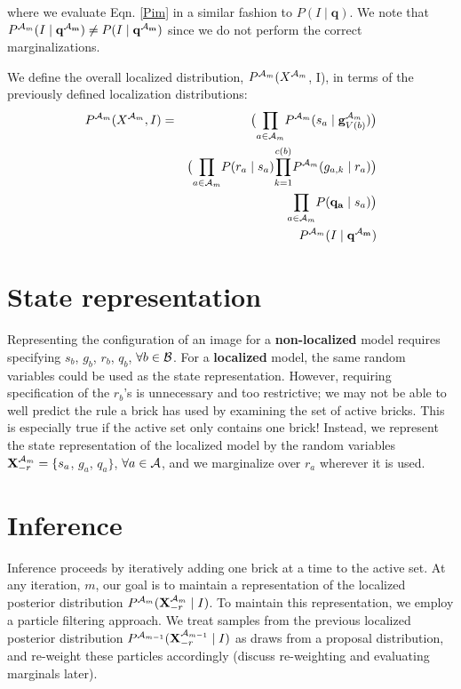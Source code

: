 \documentclass[11pt]{article}
\newcommand{\A}{{\cal A}}
\newcommand{\X}{\mathbf{X}}
\newcommand{\B}{\cal B}
\newcommand{\Xrm}{\X^{\Am}_{-r}}
\newcommand{\Am}{\A_{m}}
\begin{document}
where we evaluate Eqn. \ref{Pim} in a similar fashion to $P(I \mid \mathbf{q})$. We note that $P^{\Am}(I \mid \mathbf{q^{\Am}}) \neq P(I \mid \mathbf{q^{\Am}})$ since we do not perform the correct marginalizations.

We define the overall localized distribution, $P^{\Am}(X^{\Am}$, I), in terms of the previously defined localization distributions:
\begin{eqnarray}
P^{\Am}(X^{\Am}, I)
&=& \big({\displaystyle \prod_{a \in {\Am}}} P^{\Am}(s_a \mid \mathbf{g}^{\Am}_{V({b})}) \big ) \label{eqn.localJoint}\\
& & \big( {\displaystyle \prod_{a \in {\Am}}} P(r_a \mid s_a) {\displaystyle \prod_{k=1}^{c(b)}} P^{\Am}(g_{a,k} \mid r_a) \big) \nonumber \\
& & {\displaystyle \prod_{a \in {\Am}}} P(\mathbf{q_a} \mid s_a)\big) \nonumber \\
& & P^{\Am}(I \mid \mathbf{q^{\Am}}) \nonumber
\end{eqnarray}

\section*{State representation}

Representing the configuration of an image for a \textbf{non-localized} model requires specifying $s_b$, $g_b$, $r_b$, $q_b$, $\forall b \in \B$. For a \textbf{localized} model, the same random variables could be used as the state representation. However, requiring specification of the $r_b$'s is unnecessary and too restrictive; we may not be able to well predict the rule a brick has used by examining the set of active bricks. This is especially true if the active set only contains one brick! Instead, we represent the state representation of the localized model by the random variables $\Xrm = \{s_a$, $g_a$, $q_a\}$, $\forall a \in \A$, and we marginalize over $r_a$ wherever it is used.

\section*{Inference}

Inference proceeds by iteratively adding one brick at a time to the active set. At any iteration, $m$, our goal is to maintain a representation of the localized posterior distribution $P^{\Am}(\Xrm \mid I)$. To maintain this representation, we employ a particle filtering approach. We treat samples from the previous localized posterior distribution $P^{\A_{m-1}}(\X^{\A_{m-1}}_{-r} \mid I)$ as draws from a proposal distribution, and re-weight these particles accordingly (discuss re-weighting and evaluating marginals later).
\end{document}
